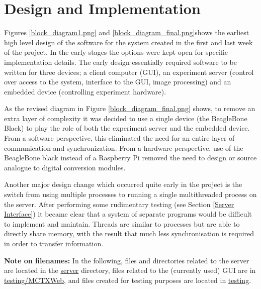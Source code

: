 \chapter{Design and Implementation}


Figures \ref{block_diagram1.png} and \ref{block_diagram_final.png}shows the earliest high level design of the software for the system created in the first and last week of the project. In the early stages the options were kept open for specific implementation details. The early design essentially required software to be written for three devices; a client computer (GUI), an experiment server (control over access to the system, interface to the GUI, image processing) and an embedded device (controlling experiment hardware). 


As the revised diagram in Figure \ref{block_diagram_final.png} shows, to remove an extra layer of complexity it was decided to use a single device (the BeagleBone Black) to play the role of both the experiment server and the embedded device. From a software perspective, this eliminated the need for an entire layer of communication and synchronization. From a hardware perspective, use of the BeagleBone black instead of a Raspberry Pi removed the need to design or source analogue to digital conversion modules.

Another major design change which occurred quite early in the project is the switch from using multiple processes to running a single multithreaded process on the server. After performing some rudimentary testing (see Section \ref{Server Interface}) it became clear that a system of separate programs would be difficult to implement and maintain. Threads are similar to processes but are able to directly share memory, with the result that much less synchronisation is required in order to transfer information.

{\bf Note on filenames:} In the following, files and directories related to the server are located in the \href{https://github.com/szmoore/MCTX3420/tree/master/server}{server} directory, files related to the (currently used) GUI are in \href{https://github.com/szmoore/MCTX3420/tree/master/testing/MCTXWeb}{testing/MCTXWeb}, and files created for testing purposes are located in \href{https://github.com/szmoore/MCTX3420/tree/master/testing}{testing}.

